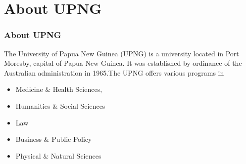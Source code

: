 \section{About UPNG}

\begin{frame}
\frametitle{About UPNG}
The University of Papua New Guinea (UPNG) is a university located in Port Moresby, capital of Papua New Guinea. It was established by ordinance of the Australian administration in 1965.The UPNG offers various programs in 
 \vspace{.4cm}
\begin{itemize}
    \item Medicine \& Health Sciences, 
    \item Humanities \& Social Sciences
    \item Law
    \item Business \& Public Policy
    \item Physical \& Natural Sciences

\end{itemize}

\end{frame}